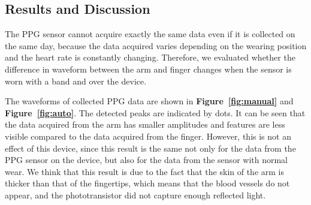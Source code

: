\documentclass[sigconf, anonymous]{acmart}
\newcommand\figref[1]{\textbf{Figure~\ref{fig:#1}}}
\begin{document}
\subsection{Results and Discussion}
The PPG sensor cannot acquire exactly the same data even if it is collected on the same day, because the data acquired varies depending on the wearing position and the heart rate is constantly changing. Therefore, we evaluated whether the difference in waveform between the arm and finger changes when the sensor is worn with a band and over the device.\par

The waveforms of collected PPG data are shown in \figref{manual} and \figref{auto}. The detected peaks are indicated by dots. It can be seen that the data acquired from the arm has smaller amplitudes and features are less visible compared to the data acquired from the finger. However, this is not an effect of this device, since this result is the same not only for the data from the PPG sensor on the device, but also for the data from the sensor with normal wear. We think that this result is due to the fact that the skin of the arm is thicker than that of the fingertips, which means that the blood vessels do not appear, and the phototransistor did not capture enough reflected light.\par
\end{document}
